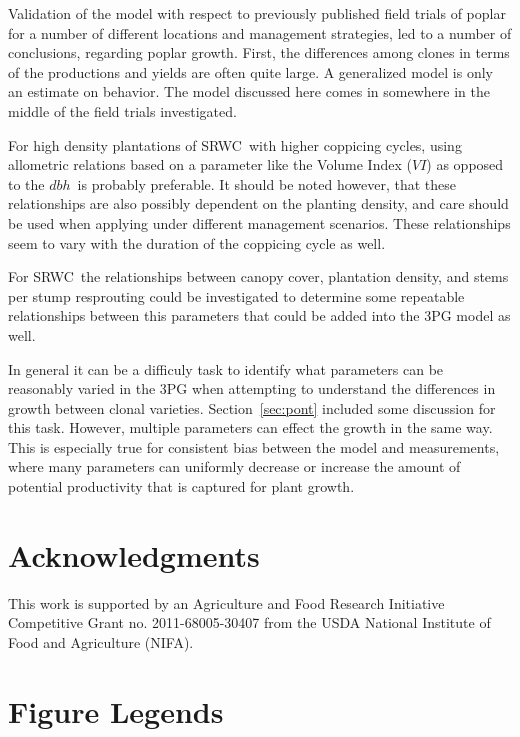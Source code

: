 \documentclass[10pt]{article}
\newcommand{\dbh}{\ensuremath{dbh}}
\newcommand{\SRWC}{\textsc{SRWC}}
\newcommand{\VI}{\ensuremath{VI}}
\begin{document}
Validation of the model with respect to previously published field trials of
poplar for a number of different locations and management strategies, led to a
number of conclusions, regarding poplar growth. First, the differences among
clones in terms of the productions and yields are often quite large. A
generalized model is only an estimate on behavior. The model discussed here
comes in somewhere in the middle of the field trials investigated.

For high density plantations of \SRWC~with higher coppicing cycles, using
allometric relations based on a parameter like the Volume Index (\VI) as opposed
to the \dbh~is probably preferable. It should be noted however, that these
relationships are also possibly dependent on the planting density, and care
should be used when applying under different management scenarios. These
relationships seem to vary with the duration of the coppicing cycle  as well.  

For \SRWC~the relationships between canopy cover, plantation density, and stems
per stump resprouting could be investigated to determine some repeatable
relationships between this parameters that could be added into the 3PG model as
well.

In general it can be a difficuly task to identify what parameters can be
reasonably varied in the 3PG when attempting to understand the differences in
growth between clonal varieties.  Section~\ref{sec:pont} included some
discussion for this task.  However, multiple parameters can effect the growth in
the same way.  This is especially true for consistent bias between the model and
measurements, where many parameters can uniformly decrease or increase the
amount of potential productivity that is captured for plant growth.


\section*{Acknowledgments}
This work is supported by an Agriculture and Food Research Initiative
Competitive Grant no. 2011-68005-30407 from the USDA National Institute of Food
and Agriculture (NIFA).



\newpage
\section*{Figure Legends}
\fi
\end{document}

